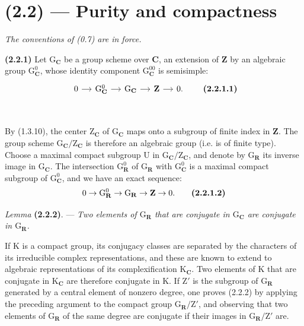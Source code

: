 \documentclass[11pt,leqno]{article}
\newcommand{\Page}[1]{\ifvmode\noindent\else\unskip\ \fi{\footnotesize\textcolor{gray}{[p.\,#1]}}\ \ignorespaces}
\begin{document}
\section*{(2.2) — Purity and compactness}

\textit{The conventions of \textup{(0.7)} are in force.}

\textbf{(2.2.1)} Let \(\mathrm{G}_{\mathbf{C}}\) be a group scheme over \(\mathbf{C}\), an extension of \(\mathbf{Z}\) by an algebraic group \(\mathrm{G}_{\mathbf{C}}^0\), whose identity component \(\mathrm{G}_{\mathbf{C}}^{00}\) is semisimple:
\[
\begin{tikzcd}[column sep=1.2em]
0 \arrow[r]
  & \mathrm{G}_{\mathbf{C}}^0 \arrow[r]
  & \mathrm{G}_{\mathbf{C}} \arrow[r]
  & \mathbf{Z} \arrow[r]
  & 0.
\end{tikzcd}
\tag*{\textbf{(2.2.1.1)}}
\]

\Page{193}

By (1.3.10), the center \(\mathrm Z_{\mathbf C}\) of \(\mathrm G_{\mathbf C}\) maps onto a subgroup of finite index in \(\mathbf Z\). The group scheme \(\mathrm G_{\mathbf C}/\mathrm Z_{\mathbf C}\) is therefore an algebraic group (i.e. is of finite type). Choose a maximal compact subgroup \(\mathrm U\) in \(\mathrm G_{\mathbf C}/\mathrm Z_{\mathbf C}\), and denote by \(\mathrm G_{\mathbf R}\) its inverse image in \(\mathrm G_{\mathbf C}\). The intersection \(\mathrm G_{\mathbf R}^0\) of \(\mathrm G_{\mathbf R}\) with \(\mathrm G_{\mathbf C}^0\) is a maximal compact subgroup of \(\mathrm G_{\mathbf C}^0\), and we have an exact sequence:
\[
0\to\mathrm G_{\mathbf R}^0\to\mathrm G_{\mathbf R}\to\mathbf Z\to0.
\tag*{\textbf{(2.2.1.2)}}
\]

\textit{Lemma} \textbf{(2.2.2)}. — \textit{Two elements of \(\mathrm G_{\mathbf R}\) that are conjugate in \(\mathrm G_{\mathbf C}\) are conjugate in \(\mathrm G_{\mathbf R}\).}

If \(\mathrm K\) is a compact group, its conjugacy classes are separated by the characters of its irreducible complex representations, and these are known to extend to algebraic representations of its complexification \(\mathrm K_{\mathbf C}\). Two elements of \(\mathrm K\) that are conjugate in \(\mathrm K_{\mathbf C}\) are therefore conjugate in  \(\mathrm K\). If \(\mathrm Z'\) is the subgroup of \(\mathrm G_{\mathbf R}\) generated by a central element of nonzero degree, one proves (2.2.2) by applying the preceding argument to the compact group \(\mathrm G_{\mathbf R}/\mathrm Z'\), and observing that two elements of \(\mathrm G_{\mathbf R}\) of the same degree are conjugate if their images in \(\mathrm G_{\mathbf R}/\mathrm Z'\) are.
\end{document}
